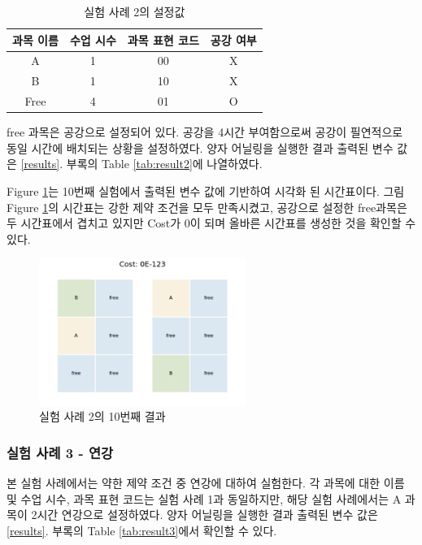 \documentclass{article}
\begin{document}
    \begin{table}[htb!]
        \centering
        \begin{tabular}{c c c c}
             \hline
             과목 이름 & 수업 시수 & 과목 표현 코드 & 공강 여부\\
             \hline
             A & 1 & 00 & X\\
             B & 1 & 10 & X\\
             Free & 4 & 01 & O\\
             \hline
        \end{tabular}
        \caption{실험 사례 2의 설정값}\label{tab:testcase2}
    \end{table}

free 과목은 공강으로 설정되어 있다. 공강을 4시간 부여함으로써 공강이 필연적으로 동일 시간에 배치되는 상황을 설정하였다. 양자 어닐링을 실행한 결과 출력된 변수 값은 \ref{results}. 부록의 Table \ref{tab:result2}에 나열하였다.

Figure \ref{fig:case2}는 10번째 실험에서 출력된 변수 값에 기반하여 시각화 된 시간표이다. 그림 Figure \ref{fig:case2}의 시간표는 강한 제약 조건을 모두 만족시켰고, 공강으로 설정한 free과목은 두 시간표에서 겹치고 있지만 Cost가 0이 되며 올바른 시간표를 생성한 것을 확인할 수 있다.

    \begin{figure}[htb!]
        \centering
        \includegraphics[width=0.6\textwidth]{images/Case2.png}
        \caption{실험 사례 2의 10번째 결과}
        \label{fig:case2}
    \end{figure}

    \subsubsection{실험 사례 3 - 연강}

본 실험 사례에서는 약한 제약 조건 중 연강에 대하여 실험한다. 각 과목에 대한 이름 및 수업 시수, 과목 표현 코드는 실험 사례 1과 동일하지만, 해당 실험 사례에서는 A 과목이 2시간 연강으로 설정하였다. 양자 어닐링을 실행한 결과 출력된 변수 값은 \ref{results}. 부록의 Table \ref{tab:result3}에서 확인할 수 있다.
\end{document}
